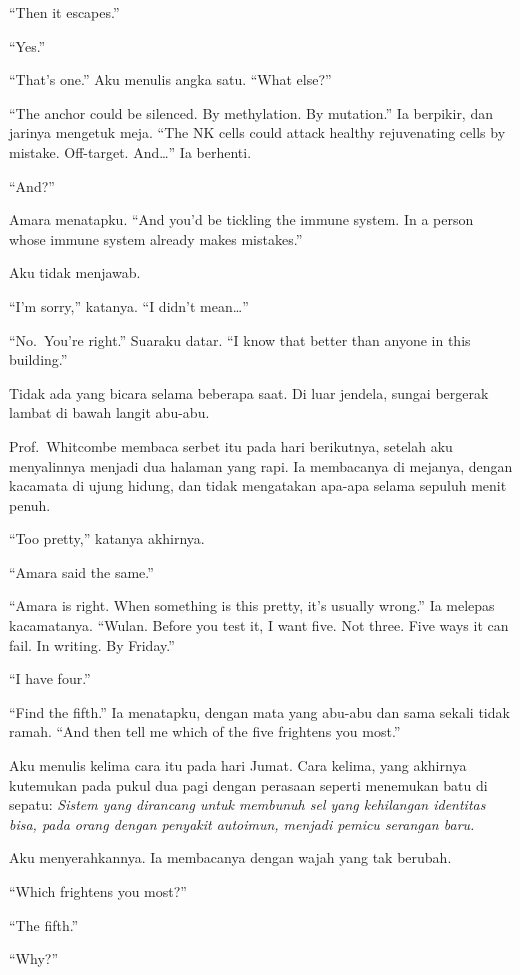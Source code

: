 \documentclass[11pt,twoside,openany]{book}
\makeatletter
\newcommand{\scenebreak}{\par\vspace{0.9em}{\centering\textsc{*\hspace{0.7em}*\hspace{0.7em}*}\par}\vspace{0.9em}\@afterindentfalse\@afterheading}
\makeatother
\begin{document}
``Then it escapes.''

``Yes.''

``That's one.'' Aku menulis angka satu. ``What else?''

``The anchor could be silenced. By methylation. By mutation.'' Ia berpikir, dan jarinya mengetuk meja. ``The NK cells could attack healthy rejuvenating cells by mistake. Off-target. And\ldots{}'' Ia berhenti.

``And?''

Amara menatapku. ``And you'd be tickling the immune system. In a person whose immune system already makes mistakes.''

Aku tidak menjawab.

``I'm sorry,'' katanya. ``I didn't mean\ldots{}''

``No.~You're right.'' Suaraku datar. ``I know that better than anyone in this building.''

Tidak ada yang bicara selama beberapa saat. Di luar jendela, sungai bergerak lambat di bawah langit abu-abu.

\scenebreak
Prof.~Whitcombe membaca serbet itu pada hari berikutnya, setelah aku menyalinnya menjadi dua halaman yang rapi. Ia membacanya di mejanya, dengan kacamata di ujung hidung, dan tidak mengatakan apa-apa selama sepuluh menit penuh.

``Too pretty,'' katanya akhirnya.

``Amara said the same.''

``Amara is right. When something is this pretty, it's usually wrong.'' Ia melepas kacamatanya. ``Wulan. Before you test it, I want five. Not three. Five ways it can fail. In writing. By Friday.''

``I have four.''

``Find the fifth.'' Ia menatapku, dengan mata yang abu-abu dan sama sekali tidak ramah. ``And then tell me which of the five frightens you most.''

Aku menulis kelima cara itu pada hari Jumat. Cara kelima, yang akhirnya kutemukan pada pukul dua pagi dengan perasaan seperti menemukan batu di sepatu: \emph{Sistem yang dirancang untuk membunuh sel yang kehilangan identitas bisa, pada orang dengan penyakit autoimun, menjadi pemicu serangan baru.}

Aku menyerahkannya. Ia membacanya dengan wajah yang tak berubah.

``Which frightens you most?''

``The fifth.''

``Why?''
\end{document}
